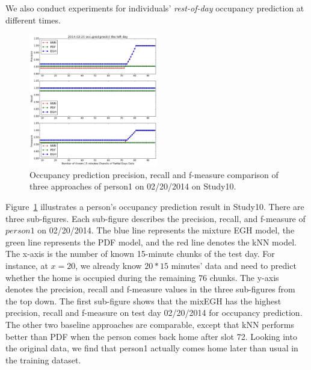 We also conduct experiments for individuals' {\em rest-of-day} occupancy prediction at different times. 
\begin{figure}[h]
\centering
\includegraphics[width=0.5\textwidth]{adlfigs/study10person12014-02-20occupied.png}
\caption{Occupancy prediction precision, recall and f-measure comparison of three approaches 
of person1 on 02/20/2014 on Study10.}
\label{fig_study10}
\end{figure}
Figure~\ref{fig_study10} illustrates a person's occupancy prediction result in Study10.
There are three sub-figures. 
Each sub-figure describes the 
precision, recall, and f-measure 
of $person1$ on 02/20/2014. 
The blue line represents the mixture EGH model,
the green line represents the PDF model,
and the red line denotes the kNN model. 
The x-axis is the number of known 15-minute chunks of the test day. 
For instance, at $x=20$, 
we already know $20*15$ minutes' data 
and need to predict whether the home is occupied during the remaining $76$ chunks. 
The y-axis denotes the precision, recall and f-measure values 
in the three sub-figures from the top down. 
The first sub-figure shows that  
the mixEGH has the highest precision, recall and f-measure on test day 02/20/2014 
for occupancy prediction. The other two baseline approaches are comparable, except that kNN performs better than PDF 
when the person comes back home after slot 72. 
Looking into the original data, we find that person1 actually comes home later than usual 
in the training dataset. 

